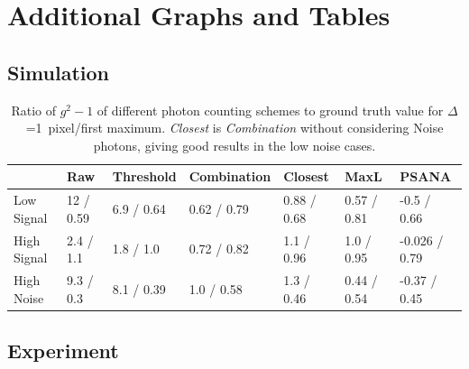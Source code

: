 \chapter{Additional Graphs and Tables}
\section{Simulation}

\begin{table}[h!]
	\caption[Ratio of $g^2-1$ of different photon counting schemes to ground truth value]{Ratio of $g^2-1$ of different photon counting schemes to ground truth value  for $\Delta$=1\, pixel/first maximum. \textit{Closest} is \textit{Combination} without considering Noise photons, giving good results in the low noise cases.}
	\label{tab:photonrecon}

\begin{adjustwidth}{-1em}{-2em}	
\small
\begin{tabular}{lllllll}
	\toprule
	 &        Raw &       Threshold &         Combination &      Closest &         MaxL &          PSANA \\
	\midrule
	Low Signal  &  12 / 0.59 &  6.9 / 0.64 &  0.62 / 0.79 &  0.88 / 0.68 &  0.57 / 0.81 &    -0.5 / 0.66 \\
	High Signal &  2.4 / 1.1 &   1.8 / 1.0 &  0.72 / 0.82 &   1.1 / 0.96 &   1.0 / 0.95 &  -0.026 / 0.79 \\
	High Noise  &  9.3 / 0.3 &  8.1 / 0.39 &   1.0 / 0.58 &   1.3 / 0.46 &  0.44 / 0.54 &   -0.37 / 0.45 \\
	\bottomrule
\end{tabular}
\end{adjustwidth}
\end{table}

\section{Experiment}

